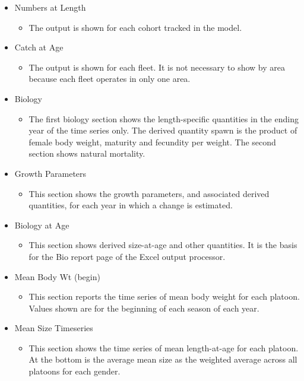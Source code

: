 \begin{itemize}
\begin{itemize}
	\end{itemize}
	\item Numbers at Length
	\begin{itemize}
		\item The output is shown for each cohort tracked in the model.
	\end{itemize}
	\item Catch at Age
	\begin{itemize}
		\item The output is shown for each fleet.  It is not necessary to show by area because each fleet operates in only one area.
	\end{itemize}
	\item Biology
	\begin{itemize}
		\item The first biology section shows the length-specific quantities in the ending year of the time series only.  The derived quantity spawn is the product of female body weight, maturity and fecundity per weight.  The second section shows natural mortality.
	\end{itemize}
	\item Growth Parameters
	\begin{itemize}
		\item This section shows the growth parameters, and associated derived quantities, for each year in which a change is estimated.
	\end{itemize}
	\item Biology at Age
	\begin{itemize}
		\item This section shows derived size-at-age and other quantities.  It is the basis for the Bio report page of the Excel output processor.
	\end{itemize}
	\item Mean Body Wt (begin)
	\begin{itemize}
		\item This section reports the time series of mean body weight for each platoon.  Values shown are for the beginning of each season of each year.
	\end{itemize}
	\item Mean Size Timeseries
	\begin{itemize}
		\item This section shows the time series of mean length-at-age for each platoon.  At the bottom is the average mean size as the weighted average across all platoons for each gender.
	\end{itemize}

\end{itemize}
